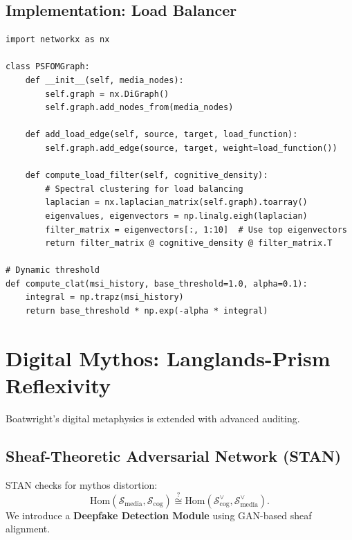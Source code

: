\documentclass[12pt]{article}
\begin{document}
\subsection{Implementation: Load Balancer}
\begin{verbatim}
import networkx as nx

class PSFOMGraph:
    def __init__(self, media_nodes):
        self.graph = nx.DiGraph()
        self.graph.add_nodes_from(media_nodes)
    
    def add_load_edge(self, source, target, load_function):
        self.graph.add_edge(source, target, weight=load_function())
    
    def compute_load_filter(self, cognitive_density):
        # Spectral clustering for load balancing
        laplacian = nx.laplacian_matrix(self.graph).toarray()
        eigenvalues, eigenvectors = np.linalg.eigh(laplacian)
        filter_matrix = eigenvectors[:, 1:10]  # Use top eigenvectors
        return filter_matrix @ cognitive_density @ filter_matrix.T

# Dynamic threshold
def compute_clat(msi_history, base_threshold=1.0, alpha=0.1):
    integral = np.trapz(msi_history)
    return base_threshold * np.exp(-alpha * integral)
\end{verbatim}

\section{Digital Mythos: Langlands-Prism Reflexivity}
Boatwright’s digital metaphysics is extended with advanced auditing.

\subsection{Sheaf-Theoretic Adversarial Network (STAN)}
STAN checks for mythos distortion:
\[
\text{Hom}(\mathcal{S}_{\text{media}}, \mathcal{S}_{\text{cog}}) \stackrel{?}{\cong} \text{Hom}(\mathcal{S}_{\text{cog}}^\vee, \mathcal{S}_{\text{media}}^\vee).
\]
We introduce a \textbf{Deepfake Detection Module} using GAN-based sheaf alignment.
\end{document}
